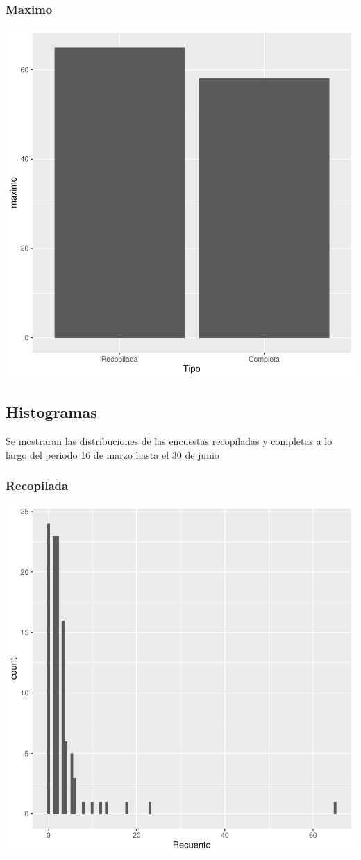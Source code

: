 \documentclass{article}
\begin{document}
\subsubsection{Maximo}

\includegraphics{seguimento2-034}

\subsection{Histogramas}
Se mostraran las distribuciones de las encuestas recopiladas y completas a lo largo del periodo 16 de marzo hasta el 30 de junio

\subsubsection{Recopilada}

\includegraphics{seguimento2-035}
\end{document}
